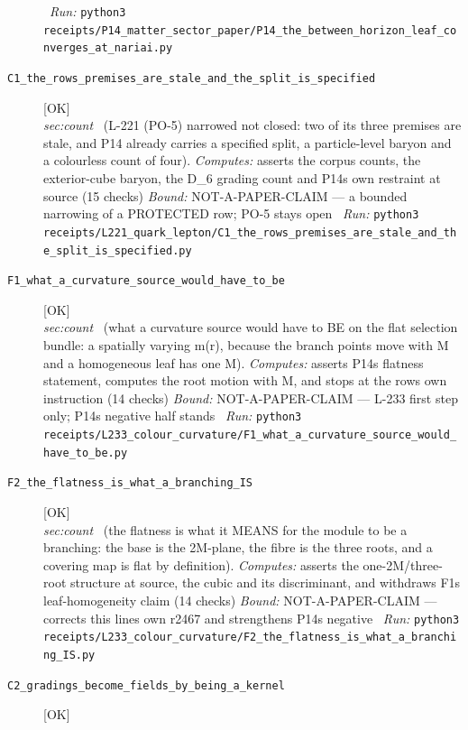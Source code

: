 \begin{description}
\ \emph{Run:} \texttt{python3 receipts/P14\_matter\_sector\_paper/P14\_the\_between\_horizon\_leaf\_converges\_at\_nariai.py}
\item[\label{rcpt:C1_the_rows_premises_are_stale_and_the_split_is_specified}\textbf{}\quad\texttt{C1\_the\_rows\_premises\_are\_stale\_and\_the\_split\_is\_specified}]\hfill\textsf{[OK]}\\
\textit{sec:count} \ (L-221 (PO-5) narrowed not closed: two of its three premises are stale, and P14 already carries a specified split, a particle-level baryon and a colourless count of four). 
\emph{Computes:} asserts the corpus counts, the exterior-cube baryon, the D\_6 grading count and P14s own restraint at source (15 checks)
 \emph{Bound:} NOT-A-PAPER-CLAIM --- a bounded narrowing of a PROTECTED row; PO-5 stays open
\ \emph{Run:} \texttt{python3 receipts/L221\_quark\_lepton/C1\_the\_rows\_premises\_are\_stale\_and\_the\_split\_is\_specified.py}
\item[\label{rcpt:F1_what_a_curvature_source_would_have_to_be}\textbf{}\quad\texttt{F1\_what\_a\_curvature\_source\_would\_have\_to\_be}]\hfill\textsf{[OK]}\\
\textit{sec:count} \ (what a curvature source would have to BE on the flat selection bundle: a spatially varying m(r), because the branch points move with M and a homogeneous leaf has one M). 
\emph{Computes:} asserts P14s flatness statement, computes the root motion with M, and stops at the rows own instruction (14 checks)
 \emph{Bound:} NOT-A-PAPER-CLAIM --- L-233 first step only; P14s negative half stands
\ \emph{Run:} \texttt{python3 receipts/L233\_colour\_curvature/F1\_what\_a\_curvature\_source\_would\_have\_to\_be.py}
\item[\label{rcpt:F2_the_flatness_is_what_a_branching_IS}\textbf{}\quad\texttt{F2\_the\_flatness\_is\_what\_a\_branching\_IS}]\hfill\textsf{[OK]}\\
\textit{sec:count} \ (the flatness is what it MEANS for the module to be a branching: the base is the 2M-plane, the fibre is the three roots, and a covering map is flat by definition). 
\emph{Computes:} asserts the one-2M/three-root structure at source, the cubic and its discriminant, and withdraws F1s leaf-homogeneity claim (14 checks)
 \emph{Bound:} NOT-A-PAPER-CLAIM --- corrects this lines own r2467 and strengthens P14s negative
\ \emph{Run:} \texttt{python3 receipts/L233\_colour\_curvature/F2\_the\_flatness\_is\_what\_a\_branching\_IS.py}
\item[\label{rcpt:C2_gradings_become_fields_by_being_a_kernel}\textbf{}\quad\texttt{C2\_gradings\_become\_fields\_by\_being\_a\_kernel}]\hfill\textsf{[OK]}\\

\end{description}
